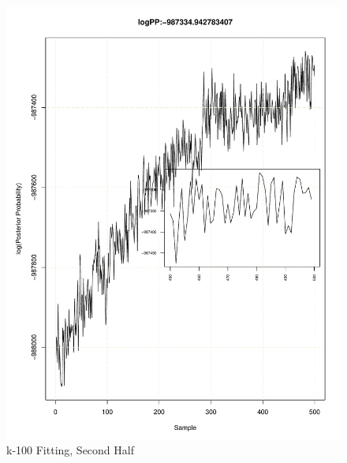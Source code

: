 \documentclass[11pt]{labbook}
\begin{document}
    \begin{figure}
        \centering
        \includegraphics[scale=.65]{FONSE_Plots/2016/December_14/k-100_loglike_final}
        \caption{k-100 Fitting, Second Half}
        \label{fig:k-100_2LIK}
    \end{figure}
\end{document}
